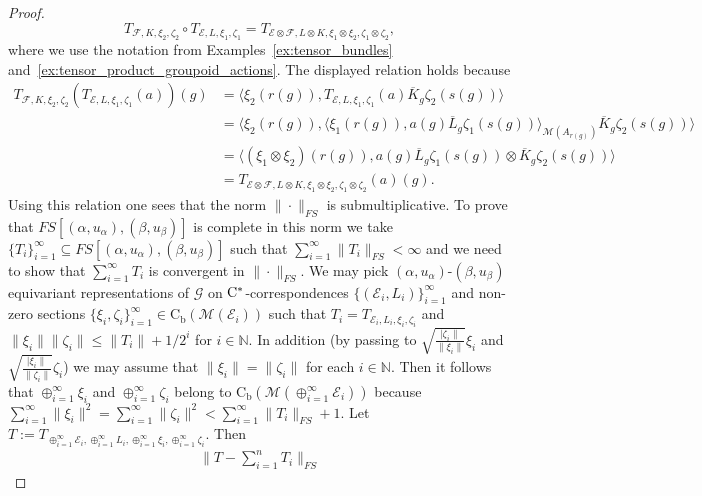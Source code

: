 \documentclass[11 pt, leqno]{amsart}
\numberwithin{equation}{section}
\theoremstyle{plain}
\theoremstyle{definition}
\newcommand*{\contb}{\mathrm{C_b}}%
\newcommand{\M}{\mathcal M}
\newcommand{\G}{\mathcal G} %
\newcommand{\EE}{\mathcal E}
\newcommand{\FF}{\mathcal F}
\newcommand{\N}{\mathbb N}
\newcommand{\cst}{\ifmmode\mathrm{C}^*\else{$\mathrm{C}^*$}\fi}
\begin{document}
\begin{proof}
\begin{equation}\label{eq:compostion_of_Fourier_Stieltjes}
    T_{\FF,K,\xi_2,\zeta_2}\circ  T_{\EE,L,\xi_1,\zeta_1}= T_{\EE\otimes \FF,L\otimes  K,\xi_1\otimes  \xi_2,\zeta_1\otimes  \zeta_2} , 
\end{equation}
where we use the notation from Examples~\ref{ex:tensor_bundles} and~\ref{ex:tensor_product_groupoid_actions}. 
The displayed relation holds because 
\[
\begin{split}
    T_{\FF,K,\xi_2,\zeta_2}  (T_{\EE,L,\xi_1,\zeta_1}(a))(g) &= \langle \xi_2(r(g)), T_{\EE,L,\xi_1,\zeta_1}(a) \overline{K}_{g}\zeta_2(s(g))\rangle %
        \\
    &= \langle \xi_2(r(g)), \langle \xi_1(r(g)), a(g) \overline{L}_{g} \zeta_1(s(g)) \rangle_{\M(A_{r(g)})} \overline{K}_{g}\zeta_2(s(g))\rangle %
        \\
    &=\langle (\xi_1\otimes \xi_2)(r(g)), a(g) \overline{L}_{g}\zeta_1(s(g)) \otimes \overline{K}_{g}\zeta_2(s(g)) \rangle%
        \\
    &= T_{\EE\otimes \FF,L\otimes  K,\xi_1\otimes  \xi_2,\zeta_1\otimes  \zeta_2}(a)(g).
\end{split}
\]
Using this relation one sees that the norm $\|\cdot\|_{FS}$ is submultiplicative.  
To prove that $FS[(\alpha,u_{\alpha}),(\beta,u_{\beta})]$ is complete in this norm we take $\{T_i\}_{i=1}^\infty\subseteq FS[(\alpha,u_{\alpha}),(\beta,u_{\beta})]$ such that $\sum_{i=1}^\infty \|T_i\|_{FS}<\infty$ and we need to show that $\sum_{i=1}^\infty T_i$ is convergent in $\|\cdot\|_{FS}$. 
We may pick $(\alpha,u_{\alpha})$-$(\beta,u_{\beta})$ equivariant representations of $\G$ on $\cst$-correspondences $\{(\EE_i, L_i)\}_{i=1}^\infty$  and non-zero sections $\{\xi_i,\zeta_i\}_{i=1}^\infty\in \contb(\M(\EE_i))$ such that $T_i=T_{\EE_i,L_i,\xi_i,\zeta_i}$ and $\|\xi_i \|\|\zeta_i\|\leq \|T_i\|+1/2^i$ for $i\in \N$.
In addition (by passing to $\sqrt{\frac{|\zeta_i\|}{\|\xi_i\|}}\xi_i$ and $\sqrt{\frac{|\xi_i\|}{\|\zeta_i\|}}\zeta_i$) we may assume that $\| \xi_i \| = \| \zeta_i \|$ for each $i \in \N$. 
Then it follows that $\oplus_{i=1}^\infty \xi_i$ and $\oplus_{i=1}^\infty \zeta_i$ belong to $\contb(\M(\oplus_{i=1}^\infty \EE_i))$ because $\sum_{i=1}^\infty \|\xi_i\|^2 = \sum_{i=1}^\infty \|\zeta_i\|^2 < \sum_{i=1}^\infty \|T_i\|_{FS} +1$. 
Let $T := T_{\oplus_{i=1}^\infty \EE_i,\oplus_{i=1}^\infty L_i,\oplus_{i=1}^\infty \xi_i,\oplus_{i=1}^\infty \zeta_i}$. 
Then 
\[
\begin{split}
    \| T-\sum_{i=1}^n T_i\|_{FS} %

\end{split}\]
\end{proof}
\end{document}
